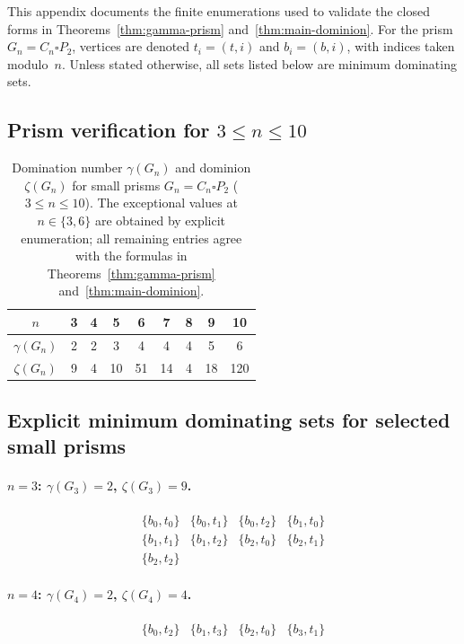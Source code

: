 \documentclass[11pt]{article}
\theoremstyle{plain}
\theoremstyle{definition}
\theoremstyle{remark}
\begin{document}
This appendix documents the finite enumerations used to validate the closed forms in
Theorems~\ref{thm:gamma-prism} and~\ref{thm:main-dominion}.  For the prism
$G_n=C_n\square P_2$, vertices are denoted $t_i=(t,i)$ and $b_i=(b,i)$, with indices taken
modulo~$n$.  Unless stated otherwise, all sets listed below are minimum dominating sets.

\subsection{Prism verification for $3\le n\le 10$}\label{app:prism-small}

\begin{table}[ht]
\centering
\caption{Domination number $\gamma(G_n)$ and dominion $\zeta(G_n)$ for small prisms
$G_n=C_n\square P_2$ ($3\le n\le 10$).  The exceptional values at $n\in\{3,6\}$ are obtained by
explicit enumeration; all remaining entries agree with the formulas in
Theorems~\ref{thm:gamma-prism} and~\ref{thm:main-dominion}.}
\label{tab:small-cases}
\setlength{\tabcolsep}{7pt}
\renewcommand{\arraystretch}{1.15}
\begin{tabular}{c|cccccccc}
\toprule
$n$ & 3 & 4 & 5 & 6 & 7 & 8 & 9 & 10 \\
\midrule
$\gamma(G_n)$ & 2 & 2 & 3 & 4 & 4 & 4 & 5 & 6 \\
$\zeta(G_n)$  & 9 & 4 & 10 & 51 & 14 & 4 & 18 & 120 \\
\bottomrule
\end{tabular}
\end{table}

\subsection{Explicit minimum dominating sets for selected small prisms}\label{app:prism-lists}

\paragraph{$n=3$: $\gamma(G_3)=2$, $\zeta(G_3)=9$.}
\[
\begin{array}{llll}
\{b_0,t_0\}&\{b_0,t_1\}&\{b_0,t_2\}&\{b_1,t_0\}\\
\{b_1,t_1\}&\{b_1,t_2\}&\{b_2,t_0\}&\{b_2,t_1\}\\
\{b_2,t_2\}&&&
\end{array}
\]

\paragraph{$n=4$: $\gamma(G_4)=2$, $\zeta(G_4)=4$.}
\[
\begin{array}{llll}
\{b_0,t_2\}&\{b_1,t_3\}&\{b_2,t_0\}&\{b_3,t_1\}
\end{array}
\]
\end{document}
